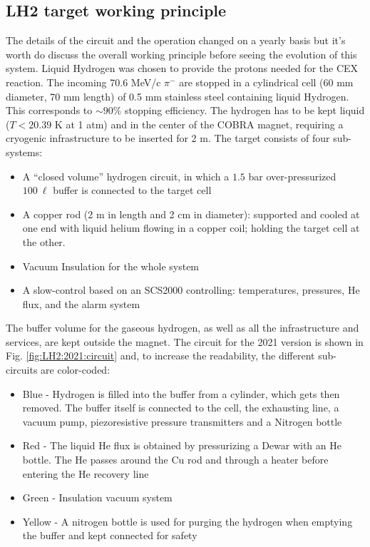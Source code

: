 \begin{refsection}
\section{LH2 target working principle}
    The details of the circuit and the operation changed on a yearly basis but it's worth do discuss the overall working principle before seeing the evolution of this system.
    Liquid Hydrogen was chosen to provide the protons needed for the CEX reaction.  
    The incoming 70.6 MeV/c $\pi^-$ are stopped in a cylindrical cell (60 mm diameter, 70 mm length) of 0.5 mm stainless steel containing liquid Hydrogen. 
    This corresponds to $\sim 90\%$ stopping efficiency.
    The hydrogen has to be kept liquid ($T<20.39$ K at 1 atm) and in the center of the COBRA magnet, requiring a cryogenic infrastructure to be inserted for 2 m.
    The target consists of four sub-systems:
    \begin{itemize}
        \item A ``closed volume'' hydrogen circuit, in which a $1.5$ bar over-pressurized $100\ \ell$ buffer is connected to the target cell 
        \item  A copper rod (2 m in length and 2 cm in diameter): supported and cooled at one end with liquid helium flowing in a copper coil; holding the target cell at the other.
        \item Vacuum Insulation for the whole system
        \item A slow-control based on an SCS2000 \cite{midas} controlling: temperatures, pressures, He flux, and the alarm system
    \end{itemize}
    The buffer volume for the gaseous hydrogen, as well as all the infrastructure and services, are kept outside the magnet. The circuit for the 2021 version is shown in Fig. \ref{fig:LH2:2021:circuit} and, to increase the readability, the different sub-circuits are color-coded:
    \begin{itemize}
        \item Blue - Hydrogen is filled into the buffer from a cylinder, which gets then removed.
        The buffer itself is connected to the cell, the exhausting line, a vacuum pump, piezoresistive pressure transmitters and a Nitrogen bottle
        \item Red - The liquid He flux is obtained by pressurizing a Dewar with an He bottle. 
        The He passes around the Cu rod and through a heater before entering the He recovery line
        \item Green - Insulation vacuum system
        \item Yellow - A nitrogen bottle is used for purging the hydrogen when emptying the buffer and kept connected for safety
    \end{itemize}


\end{refsection}
